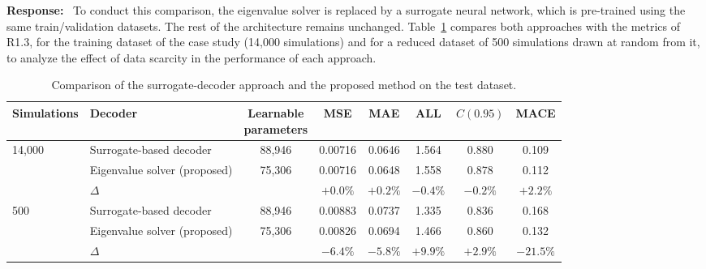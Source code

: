 \documentclass[11pt]{article}
\newenvironment{response}{\par\smallskip\noindent\color{resp}\textbf{Response:}\ }{\par}
\begin{document}
\begin{response}
To conduct this comparison, the eigenvalue solver is replaced by a surrogate neural network, which is pre-trained using the same train/validation datasets. 
The rest of the architecture remains unchanged. 
Table~\ref{tab:surrogate} compares both approaches with the metrics of R1.3, for the training dataset of the case study (14,000 simulations) and for a reduced dataset of 500 simulations drawn at random from it, to analyze the effect of data scarcity in the performance of each approach.
	\begin{table}[H]
		\centering\small
		\caption{Comparison of the surrogate-decoder approach and the proposed method on the
			test dataset.}
		\label{tab:surrogate}
		\footnotesize
		\setlength{\tabcolsep}{4pt}
		\begin{tabular}{llcccccc}
			\toprule
			Simulations & Decoder & \shortstack{Learnable\\parameters} & MSE & MAE & ALL & $C(0.95)$ & MACE \\
			\midrule
			14,000 & Surrogate-based decoder          & 88,946 & 0.00716 & 0.0646 & 1.564 & 0.880 & 0.109 \\
			       & Eigenvalue solver (proposed) & 75,306 & 0.00716 & 0.0648 & 1.558 & 0.878 & 0.112 \\
			       & $\Delta$                     &        & $+0.0\%$ & $+0.2\%$ & $-0.4\%$ & $-0.2\%$ & $+2.2\%$ \\
			\midrule
			500    & Surrogate-based decoder          & 88,946 & 0.00883 & 0.0737 & 1.335 & 0.836 & 0.168 \\
			       & Eigenvalue solver (proposed) & 75,306 & 0.00826 & 0.0694 & 1.466 & 0.860 & 0.132 \\
			       & $\Delta$                     &        & $\mathbf{-6.4\%}$ & $\mathbf{-5.8\%}$ & $\mathbf{+9.9\%}$ & $\mathbf{+2.9\%}$ & $\mathbf{-21.5\%}$ \\
			\bottomrule
		\end{tabular}
	\end{table}
	

\end{response}
\end{document}
